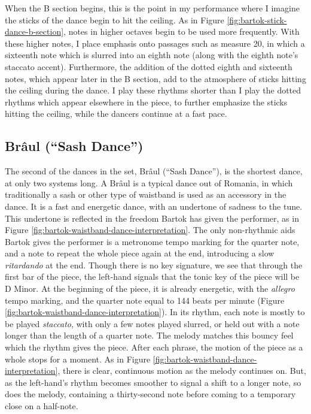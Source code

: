 When the B section begins, this is the point in my performance where I imagine the sticks of the dance begin to hit the ceiling. As in Figure \ref{fig:bartok-stick-dance-b-section}\autocite{Lung_2016}, notes in higher octaves begin to be used more frequently. With these higher notes, I place emphasis onto passages such as measure 20, in which a sixteenth note which is slurred into an eighth note (along with the eighth note's staccato accent). Furthermore, the addition of the dotted eighth and sixteenth notes, which appear later in the B section, add to the atmosphere of sticks hitting the ceiling during the dance. I play these rhythms shorter than I play the dotted rhythms which appear elsewhere in the piece, to further emphasize the sticks hitting the ceiling, while the dancers continue at a fast pace. 

\subsection{Brâul (``Sash Dance'')}

The second of the dances in the set, Brâul (``Sash Dance''), is the shortest dance, at only two systems long. A Brâul is a typical dance out of Romania, in which traditionally a sash or other type of waistband is used as an accessory in the dance. It is a fast and energetic dance, with an undertone of sadness to the tune. This undertone is reflected in the freedom Bartok has given the performer, as in Figure \ref{fig:bartok-waistband-dance-interpretation}\autocite{Lung_2016}. The only non-rhythmic aids Bartok gives the performer is a metronome tempo marking for the quarter note, and a note to repeat the whole piece again at the end, introducing a slow \textit{ritardando} at the end. Though there is no key signature, we see that through the first bar of the piece, the left-hand signals that the tonic key of the piece will be D Minor. At the beginning of the piece, it is already energetic, with the \textit{allegro} tempo marking, and the quarter note equal to 144 beats per minute (Figure \ref{fig:bartok-waistband-dance-interpretation}\autocite{Lung_2016}). In its rhythm, each note is mostly to be played \textit{staccato}, with only a few notes played slurred, or held out with a note longer than the length of a quarter note. The melody matches this bouncy feel which the rhythm gives the piece. After each phrase, the motion of the piece as a whole stops for a moment. As in Figure \ref{fig:bartok-waistband-dance-interpretation}\autocite{Lung_2016}, there is clear, continuous motion as the melody continues on. But, as the left-hand's rhythm becomes smoother to signal a shift to a longer note, so does the melody, containing a thirty-second note before coming to a temporary close on a half-note. 

